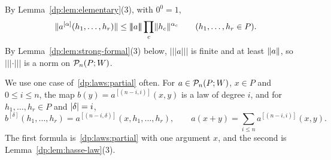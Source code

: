 By Lemma~\ref{dp:lem:elementary}(3), with $0^0=1$,
\begin{equation}\label{dp:laws:strong}
 \lVert a^{[\alpha]}(h_1,\dots,h_r)\rVert\le\lvert\!\lvert\!\lvert a\rvert\!\rvert\!\rvert\prod_c\lVert h_c\rVert^{\alpha_c}\qquad(h_1,\dots,h_r\in P).
\end{equation}
By Lemma~\ref{dp:lem:strong-formal}(3) below, $\lvert\!\lvert\!\lvert a\rvert\!\rvert\!\rvert$ is finite and at least $\lVert a\rVert$, so $\lvert\!\lvert\!\lvert\cdot\rvert\!\rvert\!\rvert$ is a norm on $\mathcal P_n(P;W)$.

We use one case of~\eqref{dp:laws:partial} often. For $a\in\mathcal P_n(P;W)$, $x\in P$ and $0\le i\le n$, the map $b(y)=a^{[(n-i,i)]}(x,y)$ is a law of degree $i$, and for $h_1,\dots,h_r\in P$ and $\lvert \delta\rvert=i$,
\begin{equation}\label{dp:eq:coefficient-identity}
 b^{[\delta]}(h_1,\dots,h_r)=a^{[(n-i,\delta)]}(x,h_1,\dots,h_r),\qquad a(x+y)=\sum_{i\le n}a^{[(n-i,i)]}(x,y).
\end{equation}
The first formula is~\eqref{dp:laws:partial} with one argument $x$, and the second is Lemma~\ref{dp:lem:hasse-law}(3).

